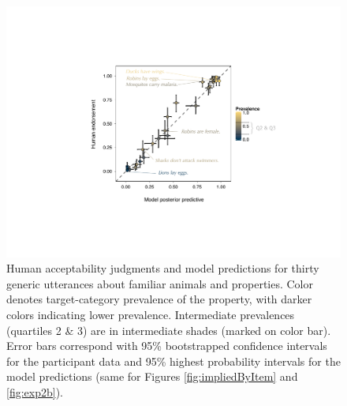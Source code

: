 \documentclass{pnastwo}
\begin{document}
\begin{article}
\begin{figure}
\centering
    \includegraphics[width=\columnwidth]{truthjudge-scatter-wLabels.pdf}
    \caption{Human acceptability judgments and model predictions for thirty generic utterances about familiar animals and properties. 
    Color denotes target-category prevalence of the property, with darker colors indicating lower prevalence. 
    Intermediate prevalences (quartiles 2 \& 3) are in intermediate shades (marked on color bar).
    Error bars correspond with 95\% bootstrapped confidence intervals for the participant data and 95\% highest probability intervals for the model predictions (same for Figures \ref{fig:impliedByItem} and \ref{fig:exp2b}).
    }
  \label{fig:modeldataBars}
\end{figure}



\end{article}
\end{document}
